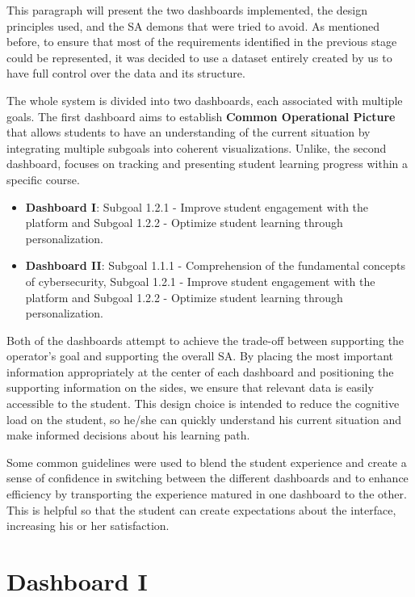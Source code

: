 This paragraph will present the two dashboards implemented, the design principles used, and the SA demons that were tried to avoid. As mentioned before, to ensure that most of the requirements identified in the previous stage could be represented, it was decided to use a dataset entirely created by us to have full control over the data and its structure.

The whole system is divided into two dashboards, each associated with multiple goals. The first dashboard aims to establish \textbf{Common Operational Picture} that allows students to have an understanding of the current situation by integrating multiple subgoals into coherent visualizations. 
Unlike, the second dashboard, focuses on tracking and presenting student learning progress within a specific course.

\begin{itemize}
    \item \textbf{Dashboard I}: Subgoal 1.2.1 - Improve student engagement with the platform and Subgoal 1.2.2 - Optimize student learning through personalization.
    \item \textbf{Dashboard II}: Subgoal 1.1.1 - Comprehension of the fundamental concepts of cybersecurity, Subgoal 1.2.1 - Improve student engagement with the platform and Subgoal 1.2.2 - Optimize student learning through personalization.
\end{itemize} 

Both of the dashboards attempt to achieve the trade-off between supporting the operator's goal and supporting the overall SA. By placing the most important information appropriately at the center of each dashboard and positioning the supporting information on the sides, we ensure that relevant data is easily accessible to the student. This design choice is intended to reduce the cognitive load on the student, so he/she can quickly understand his current situation and make informed decisions about his learning path.

Some common guidelines were used to blend the student experience and create a sense of confidence in switching between the different dashboards and to enhance efficiency by transporting the experience matured in one dashboard to the other. This is helpful so that the student can create expectations about the interface, increasing his or her satisfaction.

\section{Dashboard I}

